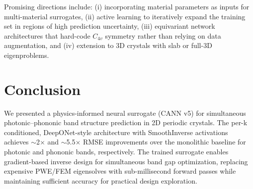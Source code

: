 \documentclass[11pt]{article}
\begin{document}
Promising directions include: (i) incorporating material parameters as inputs for multi-material surrogates, (ii) active learning to iteratively expand the training set in regions of high prediction uncertainty, (iii) equivariant network architectures that hard-code $C_{4v}$ symmetry rather than relying on data augmentation, and (iv) extension to 3D crystals with slab or full-3D eigenproblems.

\section{Conclusion}
\label{sec:conclusion}

We presented a physics-informed neural surrogate (CANN v5) for simultaneous photonic--phononic band structure prediction in 2D periodic crystals. The per-k conditioned, DeepONet-style architecture with SmoothInverse activations achieves $\sim$2$\times$ and $\sim$5.5$\times$ RMSE improvements over the monolithic baseline for photonic and phononic bands, respectively. The trained surrogate enables gradient-based inverse design for simultaneous band gap optimization, replacing expensive PWE/FEM eigensolves with sub-millisecond forward passes while maintaining sufficient accuracy for practical design exploration.


\end{document}
